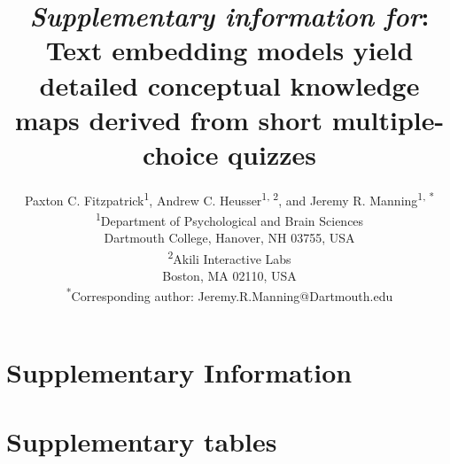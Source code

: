 \documentclass[10pt]{article}
\title{\textit{Supplementary information for}: Text embedding models yield 
detailed conceptual knowledge maps derived from short multiple-choice
quizzes}
\author{Paxton C. Fitzpatrick\textsuperscript{1}, Andrew C. 
Heusser\textsuperscript{1, 2}, and Jeremy R. Manning\textsuperscript{1, *}\\
\small{\textsuperscript{1}Department of Psychological and Brain Sciences}\\
\small{Dartmouth College, Hanover, NH 03755, USA}\\
\small{\textsuperscript{2}Akili Interactive Labs}\\
\small{Boston, MA 02110, USA}\\
\small{\textsuperscript{*}Corresponding author:
Jeremy.R.Manning@Dartmouth.edu}}
\date{}
\begin{document}
\renewcommand{\figurename}{Supplementary Figure}
\renewcommand{\tablename}{Supplementary Table}


\setcounter{equation}{0}
\setcounter{figure}{0}
\setcounter{table}{0}
\setcounter{section}{0}
\makeatletter




\section*{\LARGE Supplementary Information}


\section*{Supplementary tables}
\end{document}
